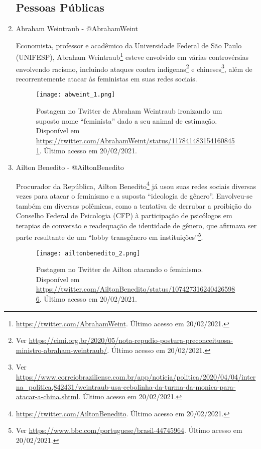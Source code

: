 \documentclass[
	12pt,				%
	openright,			%
	twoside,			%
	a4paper,			%
	english,			%
	brazil				%
	]{abntex2}
\begin{document}
\begin{anexosenv}
  
\begin{enumerate}

 \subsection*{Pessoas Públicas}
 \item Abraham Weintraub - @AbrahamWeint\label{abweint}
 
 Economista, professor e acadêmico da Universidade Federal de São Paulo (UNIFESP), Abraham Weintraub\footnote{\url{https://twitter.com/AbrahamWeint}. Último acesso em 20/02/2021.} esteve envolvido em várias controvérsias envolvendo racismo, incluindo ataques contra indígenas\footnote{Ver \url{https://cimi.org.br/2020/05/nota-repudio-postura-preconceituosa-ministro-abraham-weintraub/}. Último acesso em 20/02/2021.} e chineses\footnote{Ver \url{https://www.correiobraziliense.com.br/app/noticia/politica/2020/04/04/interna_politica,842431/weintraub-usa-cebolinha-da-turma-da-monica-para-atacar-a-china.shtml}. Último acesso em 20/02/2021.}, além de recorrentemente atacar às feministas em suas redes sociais.
 
 \begin{figure}[!htbp]
    \centering
    \texttt{[image: abweint\_1.png]}
    \caption{Postagem no Twitter de Abraham Weintraub ironizando um suposto nome ``feminista'' dado a seu animal de estimação. Disponível em \url{https://twitter.com/AbrahamWeint/status/1178414831541608451}. Último acesso em 20/02/2021.}
 \end{figure}

 \newpage

 \item Ailton Benedito - @AiltonBenedito
 
 Procurador da República, Ailton Benedito\footnote{\url{https://twitter.com/AiltonBenedito}. Último acesso em 20/02/2021.} já usou suas redes sociais diversas vezes para atacar o feminismo e a suposta ``ideologia de gênero''. Envolveu-se também em diversas polêmicas, como a tentativa de derrubar a proibição do Conselho Federal de Psicologia (CFP) à participação de psicólogos em terapias de conversão e readequação de identidade de gênero, que afirmava ser parte resultante de um ``lobby transgênero em instituições''\footnote{Ver \url{https://www.bbc.com/portuguese/brasil-44745964}. Último acesso em 20/02/2021.}.
 
 \begin{figure}[!htbp]
    \centering
    \texttt{[image: ailtonbenedito\_2.png]}
    \caption{Postagem no Twitter de Ailton atacando o feminismo. Disponível em \url{https://twitter.com/AiltonBenedito/status/1074273162404265986}. Último acesso em 20/02/2021.}
 \end{figure}


\end{enumerate}
\end{anexosenv}
\end{document}
